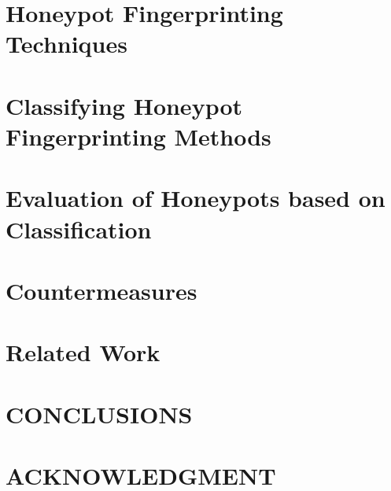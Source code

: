 \documentclass[letterpaper, 10 pt, conference]{ieeeconf}  %
\begin{document}
\section{Honeypot Fingerprinting Techniques}


\section{Classifying Honeypot Fingerprinting Methods}
   

\section{Evaluation of Honeypots based on Classification}
 
 
\section {Countermeasures}

 
\section {Related Work}
 
 
\section{CONCLUSIONS}


\addtolength{\textheight}{-12cm}   %

\section*{ACKNOWLEDGMENT}



\end{document}
